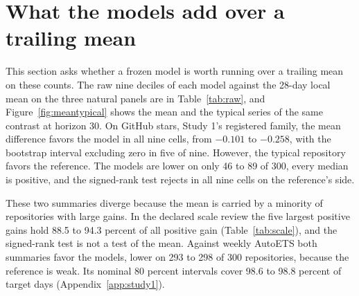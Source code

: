 \providecommand{\lm}{\texttt{local\_mean\_28}}
\providecommand{\aets}{\texttt{autoets\_weekly}}
\providecommand{\qs}{QScore9}

\section{What the models add over a trailing mean}
\label{sec:raw}

This section asks whether a frozen model is worth running over a trailing mean on these counts. The raw nine
deciles of each model against the 28-day local mean on the three natural panels are in Table~\ref{tab:raw},
and Figure~\ref{fig:meantypical} shows the mean and the typical series of the same contrast at horizon 30. On
GitHub stars, Study 1's registered family, the mean difference favors the model in all nine cells, from
$-0.101$ to $-0.258$, with the bootstrap interval excluding zero in five of nine. However, the typical
repository favors the reference. The models are lower on only 46 to 89 of 300, every median is positive, and
the signed-rank test rejects in all nine cells on the reference's side.

These two summaries diverge because the mean is carried by a minority of repositories with large gains. In the
declared scale review the five largest positive gains hold 88.5 to 94.3 percent of all positive gain
(Table~\ref{tab:scale}), and the signed-rank test is not a test of the mean. Against weekly AutoETS both
summaries favor the models, lower on 293 to 298 of 300 repositories, because the reference is weak. Its
nominal 80 percent intervals cover 98.6 to 98.8 percent of target days (Appendix~\ref{app:study1}).

